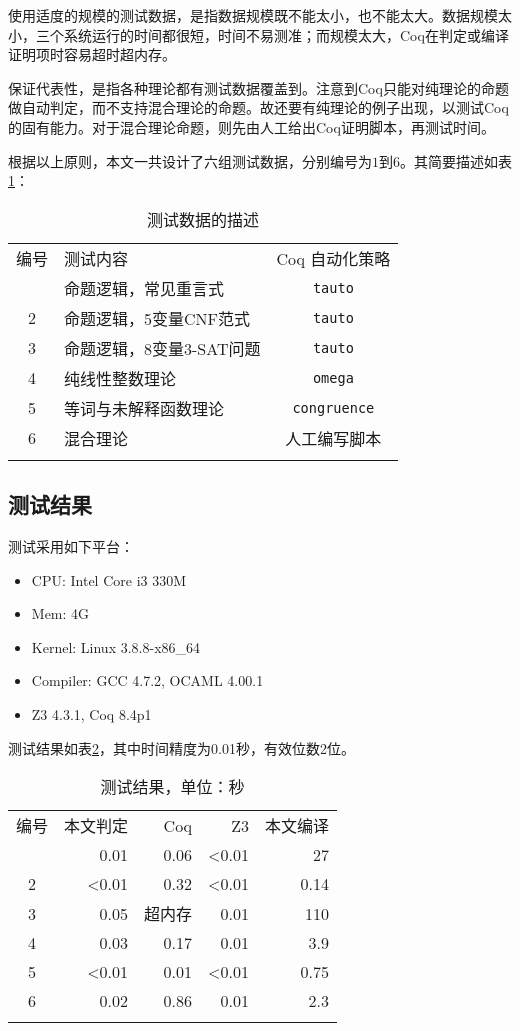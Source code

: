 使用适度的规模的测试数据，是指数据规模既不能太小，也不能太大。数据规模太小，三个系统运行的时间都很短，时间不易测准；而规模太大，Coq在判定或编译证明项时容易超时超内存。

保证代表性，是指各种理论都有测试数据覆盖到。注意到Coq只能对纯理论的命题做自动判定，而不支持混合理论的命题。故还要有纯理论的例子出现，以测试Coq的固有能力。对于混合理论命题，则先由人工给出Coq证明脚本，再测试时间。

根据以上原则，本文一共设计了六组测试数据，分别编号为$1$到$6$。其简要描述如表\ref{tab:test}：
\begin{table}[!ht]
  \caption{测试数据的描述}
  \label{tab:test}
  \centering
  \begin{tabular}{clc}
    \whline
    编号 & 测试内容 & Coq 自动化策略\\
    \whline
    1 & 命题逻辑，常见重言式 & \texttt{tauto} \\
    2 & 命题逻辑，5变量CNF范式 & \texttt{tauto} \\
    3 & 命题逻辑，8变量3-SAT问题 & \texttt{tauto} \\
    4 & 纯线性整数理论 & \texttt{omega} \\
    5 & 等词与未解释函数理论 & \texttt{congruence} \\
    6 & 混合理论 & 人工编写脚本 \\
    \whline
  \end{tabular}
\end{table}

\subsection{测试结果}
测试采用如下平台：
\begin{itemize}
  \item CPU: Intel Core i3 330M
  \item Mem: 4G
  \item Kernel: Linux 3.8.8-x86\_64
  \item Compiler: GCC 4.7.2, OCAML 4.00.1
  \item Z3 4.3.1, Coq 8.4p1
\end{itemize}

测试结果如表\ref{tab:res}，其中时间精度为0.01秒，有效位数2位。
\begin{table}[!ht]
  \caption{测试结果，单位：秒}
  \label{tab:res}
  \centering
  \begin{tabular}{crrrr}
    \whline
    编号 & 本文判定 & Coq & Z3 & 本文编译 \\
    \whline
    1 & 0.01 & 0.06 & <0.01 & 27 \\
    2 & <0.01 & 0.32 & <0.01 & 0.14 \\
    3 & 0.05 & 超内存 & 0.01 & 110 \\
    4 & 0.03 & 0.17 & 0.01 & 3.9 \\
    5 & <0.01 & 0.01 & <0.01 & 0.75 \\
    6 & 0.02 & 0.86 & 0.01 & 2.3 \\
    \whline
  \end{tabular}
\end{table}

